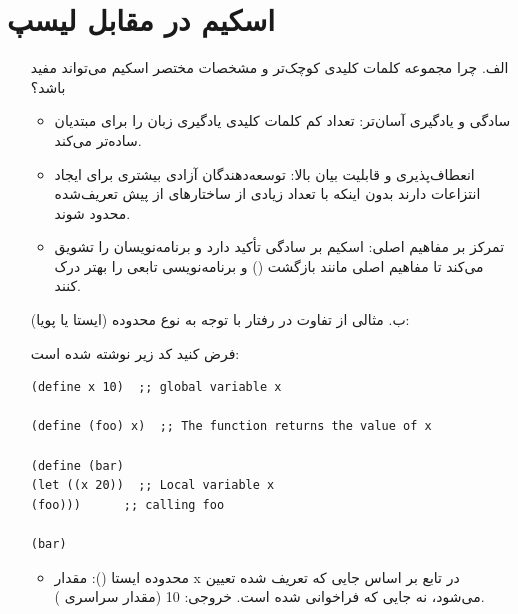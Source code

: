 \documentclass[11pt, a4paper, oneside]{article}
\begin{document}
	\tableofcontents
	\newpage
	
	\section{اسکیم در مقابل لیسپ}
	
		\begin{itemize}
			
			\item[الف.] چرا مجموعه کلمات کلیدی کوچک‌تر و مشخصات مختصر اسکیم می‌تواند مفید باشد؟
			
			\begin{itemize}
				
				\item {\large سادگی و یادگیری آسان‌تر}:
				{\normalsize تعداد کم کلمات کلیدی یادگیری زبان را برای مبتدیان ساده‌تر می‌کند.}
				
				\item {\large انعطاف‌پذیری و قابلیت بیان بالا}:
				{\normalsize توسعه‌دهندگان آزادی بیشتری برای ایجاد انتزاعات دارند بدون اینکه با تعداد زیادی از ساختارهای از پیش تعریف‌شده محدود شوند.}
				
				\item {\large تمرکز بر مفاهیم اصلی}:
				{\normalsize اسکیم بر سادگی تأکید دارد و برنامه‌نویسان را تشویق می‌کند تا مفاهیم اصلی مانند بازگشت () و برنامه‌نویسی تابعی را بهتر درک کنند.}
				
			\end{itemize}
			
			\item[ب.] مثالی از تفاوت در رفتار با توجه به نوع محدوده (ایستا یا پویا):
			
			فرض کنید کد زیر نوشته شده است:
				\begin{latin}
					\begin{lstlisting}[caption={\lr{Q1 B}}]
(define x 10)  ;; global variable x

(define (foo) x)  ;; The function returns the value of x

(define (bar)
(let ((x 20))  ;; Local variable x
(foo)))      ;; calling foo

(bar)

					\end{lstlisting}
				\end{latin}
				
				\begin{itemize}
					
					\item {\large محدوده ایستا ()}:
					{\normalsize مقدار x در تابع \lr{foo} بر اساس جایی که  تعریف شده تعیین می‌شود، نه جایی که فراخوانی شده است. خروجی: 10 (مقدار سراسری ).}
					

\end{itemize}
\end{itemize}
\end{document}
